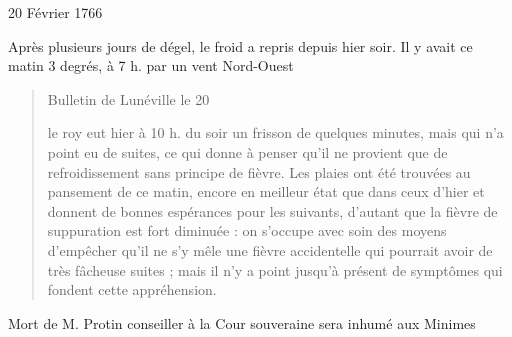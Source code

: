                      \begin{diary}{20 Février 1766}{}

                         Après plusieurs jours de dégel, le
                           froid
                           a repris depuis hier soir. Il y avait
                           ce matin 3 degrés, à 7 h. par un
                           vent
                           Nord-Ouest
                        \bigskip


                        \begin{quote}\begin{flushright}Bulletin de Lunéville
                              le 20\end{flushright}
                              le roy
                                 eut hier à 10 h. du soir un
                                 frisson
                                 de quelques minutes, mais qui n'a point
                                 eu de suites, ce qui donne à penser qu'il ne
                              provient que de refroidissement sans principe
                              de fièvre. Les plaies ont été trouvées au
                              pansement de ce matin, encore en meilleur
                              état que dans ceux d'hier et donnent de
                              bonnes espérances pour les suivants, d'autant
                              que la fièvre de suppuration est fort
                              diminuée : on s'occupe avec soin des
                              moyens d'empêcher qu'il ne s'y mêle une
                              fièvre accidentelle qui pourrait avoir de
                              très fâcheuse suites ; mais il n'y a point
                              jusqu'à présent de symptômes qui fondent
                              cette appréhension. \bigskip

        \end{quote}
                         Mort de M.
                              Protin
                           conseiller à la Cour souveraine sera inhumé aux Minimes
                        \bigskip


                     \end{diary}


